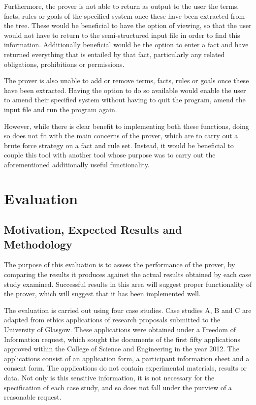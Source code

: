 \documentclass{l4proj}
\begin{document}
Furthermore, the prover is not able to return as output to the user the terms, facts, rules or goals of the specified system once these have been extracted from the tree. These would be beneficial to have the option of viewing, so that the user would not have to return to the semi-structured input file in order to find this information. Additionally beneficial would be the option to enter a fact and have returned everything that is entailed by that fact, particularly any related obligations, prohibitions or permissions. 

The prover is also unable to add or remove terms, facts, rules or goals once these have been extracted. Having the option to do so available would enable the user to amend their specified system without having to quit the program, amend the input file and run the program again. 

However, while there is clear benefit to implementing both these functions, doing so does not fit with the main concerns of the prover, which are to carry out a brute force strategy on a fact and rule set. Instead, it would be beneficial to couple this tool with another tool whose purpose was to carry out the aforementioned additionally useful functionality. 

\chapter{Evaluation}

\section{Motivation, Expected Results and Methodology}
The purpose of this evaluation is to assess the performance of the prover, by comparing the results it produces against the actual results obtained by each case study examined. Successful results in this area will suggest proper functionality of the prover, which will suggest that it has been implemented well. 

The evaluation is carried out using four case studies. Case studies A, B and C are adapted from ethics applications of research proposals submitted to the University of Glasgow. These applications were obtained under a Freedom of Information request, which sought the documents of the first fifty applications approved within the College of Science and Engineering in the year 2012. The applications consist of an application form, a participant information sheet and a consent form. The applications do not contain experimental materials, results or data. Not only is this sensitive information, it is not necessary for the specification of each case study, and so does not fall under the purview of a reasonable request. 
\end{document}

